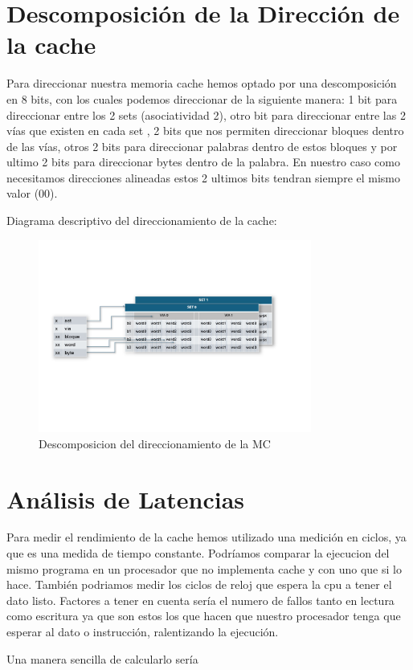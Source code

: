 \documentclass{article}
\begin{document}
\newpage

\section{Descomposición de la Dirección de la cache}
Para direccionar nuestra memoria cache hemos optado por una descomposición en 8 bits, con los cuales podemos direccionar de la siguiente manera: 1 bit para direccionar entre los 2 sets (asociatividad 2), otro bit para direccionar entre las 2 vías que existen en cada set
, 2 bits que nos permiten direccionar bloques dentro de las vías, otros 2 bits para direccionar palabras dentro de estos bloques y por ultimo 2 bits para direccionar bytes dentro de la palabra. En nuestro caso como necesitamos direcciones alineadas estos 2 ultimos bits 
tendran siempre el mismo valor (00).\par
Diagrama descriptivo del direccionamiento de la cache:\par

\begin{figure}[htbp]
  \centering
  \includegraphics[page=1, width=0.8\textwidth, clip]{assets/Descomposicion_Direcciones_light.png}
  \caption{Descomposicion del direccionamiento de la MC}
  \label{fig:imagen}
\end{figure}

\section{Análisis de Latencias}
Para medir el rendimiento de la cache hemos utilizado una medición en ciclos, ya que es una medida de tiempo constante. Podríamos comparar la ejecucion del mismo programa 
en un procesador que no implementa cache y con uno que si lo hace. También podriamos medir los ciclos de reloj que espera la cpu a tener el dato listo. Factores a tener en cuenta 
sería el numero de fallos tanto en lectura como escritura ya que son estos los que hacen que nuestro procesador tenga que esperar al dato o instrucción, ralentizando la ejecución.\cite{HennyPatt}\par
Una manera sencilla de calcularlo sería\par
\end{document}
